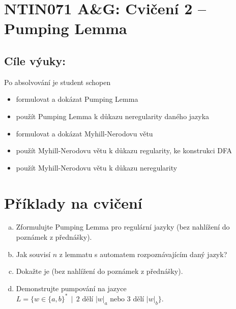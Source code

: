 \documentclass[a4paper,12pt]{amsart}
\begin{document}
\thispagestyle{empty}

\section*{NTIN071 A\&G: Cvičení 2 -- Pumping Lemma}

\subsection*{Cíle výuky:} Po absolvování je student schopen

\begin{itemize}\setlength{\itemsep}{0pt}
    \item formulovat a dokázat Pumping Lemma
    \item použít Pumping Lemma k důkazu neregularity daného jazyka
    \item formulovat a dokázat Myhill-Nerodovu větu
    \item použít Myhill-Nerodovu větu k důkazu regularity, ke konstrukci DFA
    \item použít Myhill-Nerodovu větu k důkazu neregularity
\end{itemize}


\section*{Příklady na cvičení}


\medskip\begin{problem}

    \begin{enumerate}[(a)]\setlength\itemsep{6pt}
        \item Zformulujte Pumping Lemma pro regulární jazyky (bez nahlížení do poznámek z přednášky).
        \item Jak souvisí $n$ z lemmatu s automatem rozpoznávajícím daný jazyk?
        \item Dokažte je (bez nahlížení do poznámek z přednášky).
        \item Demonstrujte pumpování na jazyce $L=\{w\in\{a,b\}^* \,\mid\,\text{2 dělí $|w|_a$ nebo 3 dělí $|w|_b$}\}$.
    \end{enumerate}

\end{problem}
\end{document}
